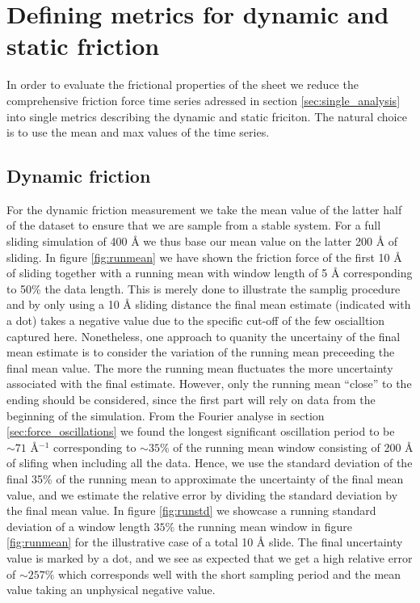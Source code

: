 \section{Defining metrics for dynamic and static friction}\label{sec:def_dyn_and_stat}

In order to evaluate the frictional properties of the sheet we reduce the comprehensive friction force time series adressed in section \ref{sec:single_analysis} into single metrics describing the dynamic and static friciton. The natural choice is to use the mean and max values of the time series. 

\subsection{Dynamic friction} 
For the dynamic friction measurement we take the mean value of the latter half
of the dataset to ensure that we are sample from a stable system. For a full
sliding simulation of 400 Å we thus base our mean value on the latter 200 Å of
sliding. In figure \ref{fig:runmean} we have shown the friction force of the
first 10 Å of sliding together with a running mean with window length of 5 Å
corresponding to 50\% the data length. This is merely done to illustrate the
samplig procedure and by only using a 10 Å sliding distance the final mean
estimate (indicated with a dot) takes a negative value due to the specific cut-off of the
few oscialltion captured here. Nonetheless, one approach to quanity the
uncertainy of the final mean estimate is to consider the variation of the
running mean preceeding the final mean value. The more the running mean
fluctuates the more uncertainty associated with the final estimate. However, only the
running mean ``close'' to the ending should be considered, since the first part
will rely on data from the beginning of the simulation. From the Fourier analyse
in section \ref{sec:force_oscillations} we found the longest significant
oscillation period to be $\sim 71$ Å$^{-1}$ corresponding to $\sim 35 \%$ of the
running mean window consisting of 200 Å of slifing when including all the data.  Hence, we use the standard deviation of the final 35\% of the running mean to approximate the
uncertainty of the final mean value, and we estimate the relative error by
dividing the standard deviation by the final mean value. In figure \ref{fig:runstd} we showcase a running standard deviation of a window length $35 \%$ the running mean window in figure \ref{fig:runmean} for the illustrative case of a total 10 Å slide. The final uncertainty value is marked by a dot, and we see as expected that we get a high relative error of $\sim 257\%$ which corresponds well with the short sampling period and the mean value taking an unphysical negative value. 


